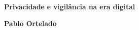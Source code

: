 \textbf{Privacidade e vigilância na era digital} \lipsum[1]

\textbf{Pablo Ortelado} \lipsum[2]







